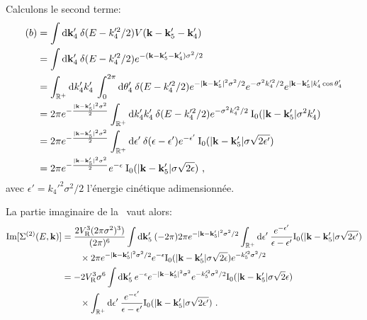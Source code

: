 Calculons le second terme:
\begin{align}
(b)&=\int{\mathop{}\mathopen{}\mathrm{d}\mathbf{k}_{\mathrm{4}}' \: \delta(E-k_{\mathrm{4}}'^2/2) V(\mathbf{k}-\mathbf{k}_{\mathrm{5}}' -\mathbf{k}_{\mathrm{4}}')} \\
&= \int{\mathop{}\mathopen{}\mathrm{d}\mathbf{k}_{\mathrm{4}}' \: \delta(E-k_{\mathrm{4}}'^2/2) e^{-(\mathbf{k}-\mathbf{k}_{\mathrm{5}}'-\mathbf{k}_{\mathrm{4}}')\sigma^2/2}}\\
&=\int_{\mathbb{R}^+}{\mathop{}\mathopen{}\mathrm{d} k_{\mathrm{4}}' k_{\mathrm{4}}' \: \int_0^{2\pi}{\mathop{}\mathopen{}\mathrm{d}\theta_{\mathrm{4}}' \: \delta(E-k_{\mathrm{4}}'^2/2) e^{-|\mathbf{k}-\mathbf{k}_{\mathrm{5}}'|^2\sigma^2/2} e^{-\sigma^2 k_{\mathrm{4}}'^2/2} e^{|\mathbf{k}-\mathbf{k}_{\mathrm{5}}'| k_{\mathrm{4}}' \cos{\theta_{\mathrm{4}}'} } }} \\
&=2\pi e^{-\frac{|\mathbf{k}-\mathbf{k}_{\mathrm{5}}'|^2\sigma^2}{2}} \int_{\mathbb{R}^+}{\mathop{}\mathopen{}\mathrm{d} k_{\mathrm{4}}' k_{\mathrm{4}}' \:\delta(E- k_{\mathrm{4}}'^2/2) e^{-\sigma^2 k_{\mathrm{4}}'^2/2} \: \mathrm{I_0}(|\mathbf{k}-\mathbf{k}_{\mathrm{5}}'| \sigma^2 k_{\mathrm{4}}')}\\
&=2\pi e^{-\frac{|\mathbf{k}-\mathbf{k}_{\mathrm{5}}'|^2\sigma^2}{2}} \int_{\mathbb{R}^+}{\mathop{}\mathopen{}\mathrm{d}\epsilon' \:\delta(\epsilon-\epsilon') e^{-\epsilon'} \: \mathrm{I_0}(|\mathbf{k}-\mathbf{k}_{\mathrm{5}}'| \sigma \sqrt{2\epsilon'})}\\
&=2\pi e^{-\frac{|\mathbf{k}-\mathbf{k}_{\mathrm{5}}'|^2\sigma^2}{2}} e^{-\epsilon} \: \mathrm{I_0}(|\mathbf{k}-\mathbf{k}_{\mathrm{5}}'| \sigma \sqrt{2\epsilon}) \text{ ,}
\end{align}
avec $\epsilon'=k_{\mathrm{4}}'^2\sigma^2/2$ l'énergie cinétique adimensionnée.

La partie imaginaire de la \selfenergy\ vaut alors:
\begin{align}
\mathrm{Im}[ \Sigma^{(2)}(E,\mathbf{k})]&= \frac{2 V_{\mathrm{R}}^3 (2\pi\sigma^2)^3)}{(2\pi)^6} \int{\mathop{}\mathopen{}\mathrm{d}\mathbf{k}_{\mathrm{5}}' \: (-2\pi) 2\pi e^{-|\mathbf{k}-\mathbf{k}_{\mathrm{5}}'|^2\sigma^2/2} \int_{\mathbb{R}^+}{\mathop{}\mathopen{}\mathrm{d}\epsilon' \: \frac{e^{-\epsilon'}}{\epsilon-\epsilon'} \mathrm{I_0}(|\mathbf{k}-\mathbf{k}_{\mathrm{5}}'|\sigma\sqrt{2\epsilon'})}}\\
&\nonumber \qquad \times 2\pi e^{-|\mathbf{k}-\mathbf{k}_{\mathrm{5}}'|^2\sigma^2/2} e^{-\epsilon} \mathrm{I_0}(|\mathbf{k}-\mathbf{k}_{\mathrm{5}}'|\sigma \sqrt{2\epsilon}) e^{-k_{\mathrm{5}}'^2\sigma^2/2} \\
 &= -2V_{\mathrm{R}}^3\sigma^6 \int{\mathop{}\mathopen{}\mathrm{d}\mathbf{k}_{\mathrm{5}}' \: e^{-\epsilon} e^{-|\mathbf{k}-\mathbf{k}_{\mathrm{5}}'|^2 \sigma^2} e^{-k_{\mathrm{5}}'^2 \sigma^2/2} \mathrm{I_0}(|\mathbf{k}-\mathbf{k}_{\mathrm{5}}'|\sigma \sqrt{2}\epsilon)} \\
 &\nonumber \qquad \times \int_{\mathbb{R}^+}{\mathop{}\mathopen{}\mathrm{d} \epsilon' \: \frac{e^{-\epsilon'}}{\epsilon-\epsilon'} \mathrm{I_0}(|\mathbf{k}-\mathbf{k}_{\mathrm{5}}'|\sigma \sqrt{2\epsilon'})} \text{ .}
\end{align}



